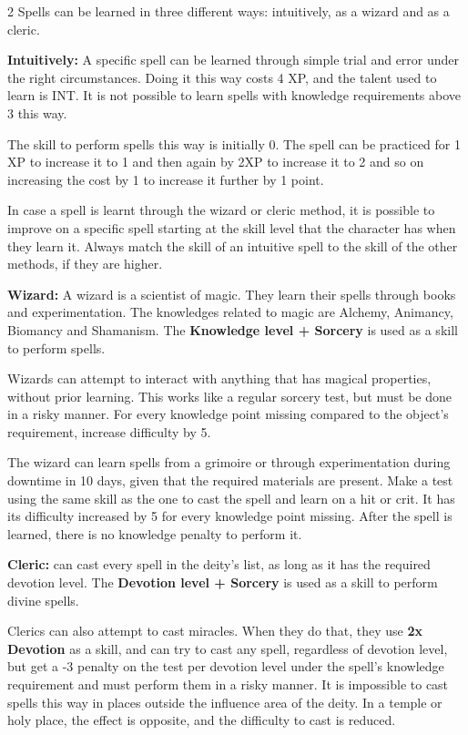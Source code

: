 \begin{multicols}{2}
Spells can be learned in three different ways: intuitively, as a wizard and as a cleric.

\textbf{Intuitively:} A specific spell can be learned through simple trial and error under the right circumstances. Doing it this way costs 4 XP, and the talent used to learn is INT. It is not possible to learn spells with knowledge requirements above 3 this way.

The skill to perform spells this way is initially 0. The spell can be practiced for 1 XP to increase it to 1 and then again by 2XP to increase it to 2 and so on increasing the cost by 1 to increase it further by 1 point. 

In case a spell is learnt through the wizard or cleric method, it is possible to improve on a specific spell starting at the skill level that the character has when they learn it. Always match the skill of an intuitive spell to the skill of the other methods, if they are higher.

\textbf{Wizard:} A wizard is a scientist of magic. They learn their spells through books and experimentation. The knowledges related to magic are Alchemy, Animancy, Biomancy and Shamanism. The \textbf{Knowledge level + Sorcery} is used as a skill to perform spells.

Wizards can attempt to interact with anything that has magical properties, without prior learning. This works like a regular sorcery test, but must be done in a risky manner. For every knowledge point missing compared to the object's requirement, increase difficulty by 5.

The wizard can learn spells from a grimoire or through experimentation during downtime in 10 days, given that the required materials are present. Make a test using the same skill as the one to cast the spell and learn on a hit or crit. It has its difficulty increased by 5 for every knowledge point missing. After the spell is learned, there is no knowledge penalty to perform it.

\textbf{Cleric:} can cast every spell in the deity's list, as long as it has the required devotion level. The \textbf{Devotion level + Sorcery} is used as a skill to perform divine spells.

Clerics can also attempt to cast miracles. When they do that, they use \textbf{2x Devotion} as a skill, and can try to cast any spell, regardless of devotion level, but get a -3 penalty on the test per devotion level under the spell's knowledge requirement and must perform them in a risky manner. It is impossible to cast spells this way in places outside the influence area of the deity. In a temple or holy place, the effect is opposite, and the difficulty to cast is reduced. 


\end{multicols}
